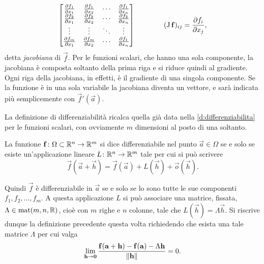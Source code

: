 \[
\begin{bmatrix}
\frac{\partial {f_1}}{\partial {x_1}}	&\frac{\partial {f_1}}{\partial {x_2}}	&\cdots	&\frac{\partial {f_1}}{\partial {x_n}}\\
\frac{\partial {f_2}}{\partial {x_1}}	&\frac{\partial {f_2}}{\partial {x_2}}	&\cdots	&\frac{\partial {f_2}}{\partial {x_n}}\\
\vdots			&\vdots			&\ddots	&\vdots\\
\frac{\partial {f_m}}{\partial {x_1}}	&\frac{\partial {f_m}}{\partial {x_2}}	&\cdots	&\frac{\partial {f_1}}{\partial {x_n}}
\end{bmatrix}\qquad\qquad(\operatorname{J}\mathbf{f})_{ij}=\frac{\partial {f_i}}{\partial {x_j}},
\]
detta \emph{jacobiana} di $\vec f$. Per le funzioni scalari, che hanno una sola componente, la jacobiana è composta soltanto della prima riga e si riduce quindi al gradiente. Ogni riga della jacobiana, in effetti, è il gradiente di una singola componente. Se la funzione è in una sola variabile la jacobiana diventa un vettore, e sarà indicata più semplicemente con $\vec f'(\vec a)$.

La definizione di differenziabilità ricalca quella già data nella \ref{d:differenziabilita} per le funzioni scalari, con ovviamente $m$ dimensioni al posto di una soltanto.
\begin{definizione}
La funzione $\mathbf{f}\colon\Omega\subset\mathbb{R}^n\to\mathbb{R}^m$ si dice differenziabile nel punto $\vec a\in\Omega$ se e solo se esiste un'applicazione lineare $L\colon\mathbb{R}^n\to\mathbb{R}^m$ tale per cui si può scrivere
\begin{equation} \label{eq:differenziabilita-app-vett}
\vec f(\vec a+\vec h)=\vec f(\vec a)+L(\vec h)+\vec o(\vec h).
\end{equation}
\end{definizione}
Quindi $\vec f$ è differenziabile in $\vec a$ se e solo se lo sono tutte le sue componenti $f_1,f_2,\dots,f_m$.
A questa applicazione $L$ %
si può associare una matrice, fissata, $\Lambda\in\operatorname{mat}(m,n,\mathbb{R})$, cioè con $m$ righe e $n$ colonne, tale che $L(\vec h)=\Lambda\vec h$. Si riscrive dunque la definizione precedente questa volta richiedendo che esista una tale matrice $\Lambda$ per cui valga
\begin{equation} \label{eq:differenziabilita-vett}
\lim_{\mathbf{h}\to\mathbf{0}}\frac{\mathbf{f}(\mathbf{a}+\mathbf{h})-\mathbf{f}(\mathbf{a})-\Lambda\mathbf{h}}{\left\|{\mathbf{h}}\right\|}=0.
\end{equation}

